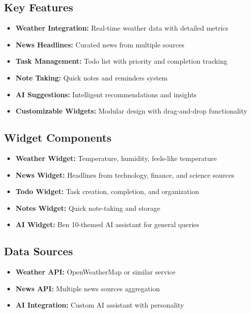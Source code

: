 \documentclass[11pt,a4paper]{article}
\begin{document}
\subsection{Key Features}
\begin{itemize}[leftmargin=1.5cm]
\item \textbf{Weather Integration:} Real-time weather data with detailed metrics
\item \textbf{News Headlines:} Curated news from multiple sources
\item \textbf{Task Management:} Todo list with priority and completion tracking
\item \textbf{Note Taking:} Quick notes and reminders system
\item \textbf{AI Suggestions:} Intelligent recommendations and insights
\item \textbf{Customizable Widgets:} Modular design with drag-and-drop functionality
\end{itemize}

\subsection{Widget Components}
\begin{itemize}[leftmargin=1.5cm]
\item \textbf{Weather Widget:} Temperature, humidity, feels-like temperature
\item \textbf{News Widget:} Headlines from technology, finance, and science sources
\item \textbf{Todo Widget:} Task creation, completion, and organization
\item \textbf{Notes Widget:} Quick note-taking and storage
\item \textbf{AI Widget:} Ben 10-themed AI assistant for general queries
\end{itemize}

\subsection{Data Sources}
\begin{itemize}[leftmargin=1.5cm]
\item \textbf{Weather API:} OpenWeatherMap or similar service
\item \textbf{News API:} Multiple news sources aggregation
\item \textbf{AI Integration:} Custom AI assistant with personality
\end{itemize}
\end{document}

